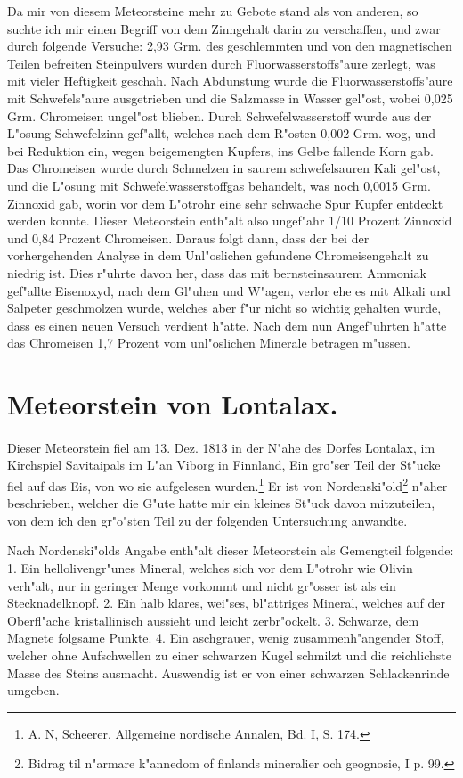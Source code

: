 \documentclass[a4paper, 11pt, oneside]{article}
\begin{document}
Da mir von diesem Meteorsteine mehr zu Gebote stand als von anderen, so suchte ich mir einen Begriff von dem Zinngehalt darin zu verschaffen, und zwar durch folgende Versuche: 2,93 Grm. des geschlemmten und von den magnetischen Teilen befreiten Steinpulvers wurden durch Fluorwasserstoffs"aure zerlegt, was mit vieler Heftigkeit geschah. Nach Abdunstung wurde die Fluorwasserstoffs"aure mit Schwefels"aure ausgetrieben und die Salzmasse in Wasser gel"ost, wobei 0,025 Grm. Chromeisen ungel"ost blieben. Durch Schwefelwasserstoff wurde aus der L"osung Schwefelzinn gef"allt, welches nach dem R"osten 0,002 Grm. wog, und bei Reduktion ein, wegen beigemengten Kupfers, ins Gelbe fallende Korn gab. Das Chromeisen wurde durch Schmelzen in saurem schwefelsauren Kali gel"ost, und die L"osung mit Schwefelwasserstoffgas behandelt, was noch 0,0015 Grm. Zinnoxid gab, worin vor dem L"otrohr eine sehr schwache Spur Kupfer entdeckt werden konnte. Dieser Meteorstein enth"alt also ungef"ahr 1/10 Prozent Zinnoxid und 0,84 Prozent Chromeisen. Daraus folgt dann, dass der bei der vorhergehenden Analyse in dem Unl"oslichen gefundene Chromeisengehalt zu niedrig ist. Dies r"uhrte davon her, dass das mit bernsteinsaurem Ammoniak gef"allte Eisenoxyd, nach dem Gl"uhen und W"agen, verlor ehe es mit Alkali und Salpeter geschmolzen wurde, welches aber f"ur nicht so wichtig gehalten wurde, dass es einen neuen Versuch verdient h"atte. Nach dem nun Angef"uhrten h"atte das Chromeisen 1,7 Prozent vom unl"oslichen Minerale betragen m"ussen.

\section{Meteorstein von Lontalax.}
\paragraph{}
Dieser Meteorstein fiel am 13. Dez. 1813 in der N"ahe des Dorfes Lontalax, im Kirchspiel Savitaipals im L"an Viborg in Finnland, Ein gro"ser Teil der St"ucke fiel auf das Eis, von wo sie aufgelesen wurden.\footnote{A. N, Scheerer, Allgemeine nordische Annalen, Bd. I, S. 174.} Er ist von Nordenski"old\footnote{Bidrag til n"armare k"annedom of finlands mineralier och geognosie, I p. 99.} n"aher beschrieben, welcher die G"ute hatte mir ein kleines St"uck davon mitzuteilen, von dem ich den gr"o"sten Teil zu der folgenden Untersuchung anwandte.

Nach Nordenski"olds Angabe enth"alt dieser Meteorstein als Gemengteil folgende: 1. Ein hellolivengr"unes Mineral, welches sich vor dem L"otrohr wie Olivin verh"alt, nur in geringer Menge vorkommt und nicht gr"osser ist als ein Stecknadelknopf. 2. Ein halb klares, wei"ses, bl"attriges Mineral, welches auf der Oberfl"ache kristallinisch aussieht und leicht zerbr"ockelt. 3. Schwarze, dem Magnete folgsame Punkte. 4. Ein aschgrauer, wenig zusammenh"angender Stoff, welcher ohne Aufschwellen zu einer schwarzen Kugel schmilzt und die reichlichste Masse des Steins ausmacht. Auswendig ist er von einer schwarzen Schlackenrinde umgeben.
\end{document}
